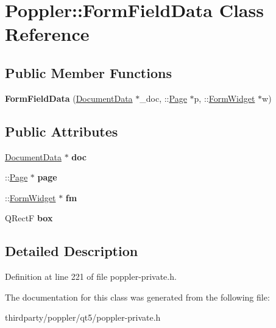\hypertarget{class_poppler_1_1_form_field_data}{}\section{Poppler\+:\+:Form\+Field\+Data Class Reference}
\label{class_poppler_1_1_form_field_data}
\subsection*{Public Member Functions}
\begin{DoxyCompactItemize}
\item 
\mbox{\label{class_poppler_1_1_form_field_data_afdc07019070452b5fcc224f32f4c5b35}} 
{\bfseries Form\+Field\+Data} (\hyperlink{class_poppler_1_1_document_data}{Document\+Data} $\ast$\+\_\+doc, \+::\hyperlink{class_poppler_1_1_page}{Page} $\ast$p, \+::\hyperlink{class_form_widget}{Form\+Widget} $\ast$w)
\end{DoxyCompactItemize}
\subsection*{Public Attributes}
\begin{DoxyCompactItemize}
\item 
\mbox{\label{class_poppler_1_1_form_field_data_ae7eb50ff6162eef06871ecbc5989142a}} 
\hyperlink{class_poppler_1_1_document_data}{Document\+Data} $\ast$ {\bfseries doc}
\item 
\mbox{\label{class_poppler_1_1_form_field_data_ad8bc695cd7a4da34da3dd2bc5d93f065}} 
\+::\hyperlink{class_poppler_1_1_page}{Page} $\ast$ {\bfseries page}
\item 
\mbox{\label{class_poppler_1_1_form_field_data_af10466df93aa7abf1677eca725bf5a40}} 
\+::\hyperlink{class_form_widget}{Form\+Widget} $\ast$ {\bfseries fm}
\item 
\mbox{\label{class_poppler_1_1_form_field_data_a0bafabfde36e1c26314a19e0fff7f97c}} 
Q\+RectF {\bfseries box}
\end{DoxyCompactItemize}


\subsection{Detailed Description}


Definition at line 221 of file poppler-\/private.\+h.



The documentation for this class was generated from the following file\+:\begin{DoxyCompactItemize}
\item 
thirdparty/poppler/qt5/poppler-\/private.\+h\end{DoxyCompactItemize}
